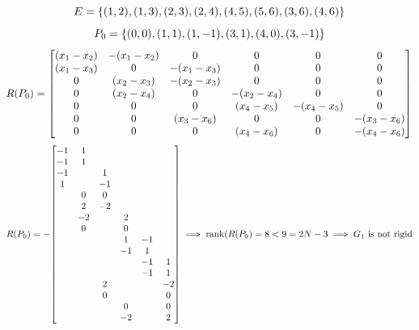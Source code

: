\documentclass[]{article}
\numberwithin{equation}{section}
\begin{document}
\[
    E = \qty{
        (1,2),
        (1,3),
        (2,3),
        (2,4),
        (4,5),
        (5,6),
        (3,6),
        (4,6)
    }
\]\[
    P_0 = \qty{
        ( 0, 0),
        ( 1, 1),
        ( 1,-1),
        ( 3, 1),
        ( 4, 0),
        ( 3,-1)
    }
\]\[
    R(P_0) = \mqty[
        (x_1 - x_2) & -(x_1 - x_2) & 0              & 0              & 0              & 0              \\
        (x_1 - x_3) & 0              & -(x_1 - x_3) & 0              & 0              & 0              \\
        0             & (x_2 - x_3)  & -(x_2 - x_3) & 0              & 0              & 0              \\
        0             & (x_2 - x_4)  & 0              & -(x_2 - x_4) & 0              & 0              \\
        0             & 0              & 0              & (x_4 - x_5)  & -(x_4 - x_5) & 0              \\
        0             & 0              & (x_3 - x_6)  & 0              & 0              & -(x_3 - x_6) \\
        0             & 0              & 0              & (x_4 - x_6)  & 0              & -(x_4 - x_6)
    ]
\]\[
    R(P_0) = -\mqty[
        -1 & 1  &    &    &    &    \\
        -1 & 1  &    &    &    &    \\
        -1 &    & 1  &    &    &    \\
        1  &    & -1 &    &    &    \\
        & 0  & 0  &    &    &    \\
        & 2  & -2 &    &    &    \\
        & -2 &    & 2  &    &    \\
        & 0  &    & 0  &    &    \\
        &    &    & 1  & -1 &    \\
        &    &    & -1 & 1  &    \\
        &    &    &    & -1 & 1  \\
        &    &    &    & -1 & 1  \\
        &    & 2  &    &    & -2 \\
        &    & 0  &    &    & 0  \\
        &    &    & 0  &    & 0  \\
        &    &    & -2 &    & 2 
    ] \implies \rank(R(P_0) = 8 < 9 = 2 N -3
    \implies G_1 \text{ is not rigid}
\]
\end{document}
